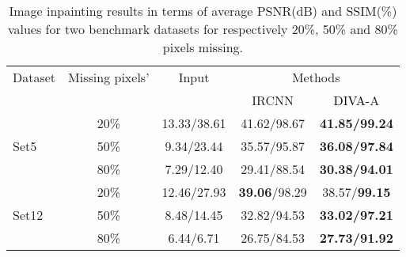\documentclass[10pt,journal,compsoc]{IEEEtran}
\newcommand\bdr[1]{{\textbf{#1}}}
\newcommand{\dk}{\textcolor{black}}
\begin{document}
\begin{table}[t!]

\begin{scriptsize}
\begin{center}
\caption{Image inpainting results in terms of average PSNR(dB) and SSIM(\%) values for two benchmark datasets for respectively 20\%, 50\% and 80\% pixels missing.}
\label{tab:tab_psnr_ssim_image_impainting}
\begin{tabular}{l c ccc}
\hline
Dataset & Missing pixels' & Input & \multicolumn{2}{c}{Methods}\\ 

& & & IRCNN\cite{Zhang2017learning} & \dk{DIVA}-A \\
\hline


\multirow{3}{*}{Set5}

& 20\% & 13.33/38.61  & 41.62/98.67 & \bdr{41.85/99.24} \\

& 50\% & 9.34/23.44  & 35.57/95.87 & \bdr{36.08/97.84} \\

& 80\% & 7.29/12.40  & 29.41/88.54 & \bdr{30.38/94.01} \\


\hline


\multirow{3}{*}{Set12}

& 20\% & 12.46/27.93  & \bdr{39.06}/98.29 & 38.57/\bdr{99.15} \\

& 50\% & 8.48/14.45  & 32.82/94.53 & \bdr{33.02/97.21} \\

& 80\% & 6.44/6.71  & 26.75/84.53 & \bdr{27.73/91.92} \\

\hline


\end{tabular}\end{center}
\end{scriptsize}
\end{table}
\end{document}
